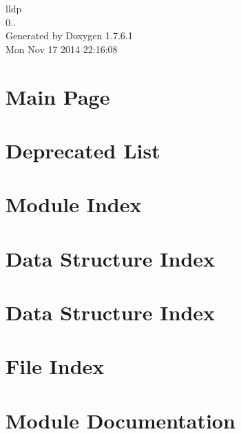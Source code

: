 \documentclass[a4paper]{book}
\begin{document}
\begin{titlepage}
\vspace*{7cm}
\begin{center}
{\Large lldp \\[1ex]\large 0.. }\\
\vspace*{1cm}
{\large \-Generated by Doxygen 1.7.6.1}\\
\vspace*{0.5cm}
{\small Mon Nov 17 2014 22:16:08}\\
\end{center}
\end{titlepage}
\clearemptydoublepage
{}
\tableofcontents
\clearemptydoublepage
{}
\chapter{\-Main \-Page}
\label{index}
\chapter{\-Deprecated \-List}
\label{deprecated}

\chapter{\-Module \-Index}

\chapter{\-Data \-Structure \-Index}

\chapter{\-Data \-Structure \-Index}

\chapter{\-File \-Index}

\chapter{\-Module \-Documentation}






\end{document}
